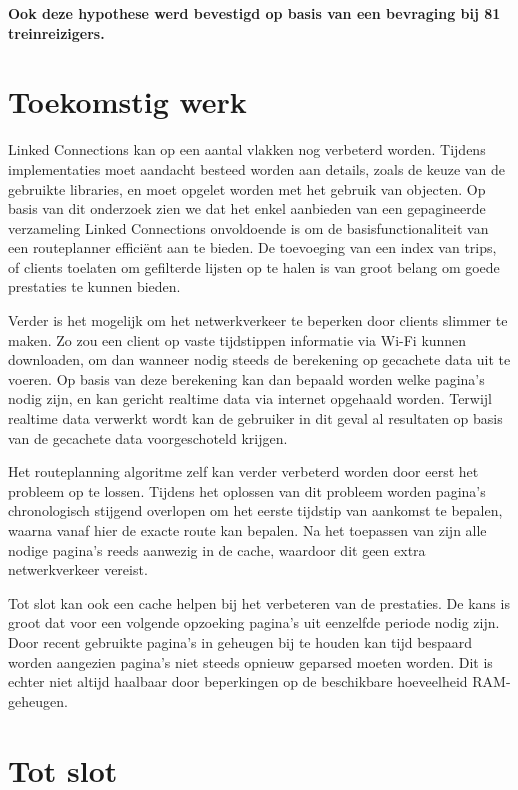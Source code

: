 \textbf{Ook deze hypothese werd bevestigd op basis van een bevraging bij 81 treinreizigers.}
	
\section{Toekomstig werk}
\label{sec:futurework}
Linked Connections kan op een aantal vlakken nog verbeterd worden. Tijdens implementaties moet aandacht besteed worden aan details, zoals de keuze van de gebruikte libraries, en moet opgelet worden met het gebruik van  objecten. Op basis van dit onderzoek zien we dat het enkel aanbieden van een gepagineerde verzameling Linked Connections onvoldoende is om de basisfunctionaliteit van een routeplanner efficiënt aan te bieden. De toevoeging van een index van trips, of clients toelaten om gefilterde lijsten op te halen is van groot belang om goede prestaties te kunnen bieden.

Verder is het mogelijk om het netwerkverkeer te beperken door clients slimmer te maken. Zo zou een client op vaste tijdstippen informatie via Wi-Fi kunnen downloaden, om dan wanneer nodig steeds de berekening op gecachete data uit te voeren. Op basis van deze berekening kan dan bepaald worden welke pagina's nodig zijn, en kan gericht realtime data via internet opgehaald worden. Terwijl realtime data verwerkt wordt kan de gebruiker in dit geval al resultaten op basis van de gecachete data voorgeschoteld krijgen.

Het routeplanning algoritme zelf kan verder verbeterd worden door eerst het  probleem op te lossen. Tijdens het oplossen van dit probleem worden pagina's chronologisch stijgend overlopen om het eerste tijdstip van aankomst te bepalen, waarna  vanaf hier de exacte route kan bepalen. Na het toepassen van  zijn alle nodige pagina's reeds aanwezig in de cache, waardoor dit geen extra netwerkverkeer vereist.

Tot slot kan ook een  cache helpen bij het verbeteren van de prestaties. De kans is groot dat voor een volgende opzoeking pagina's uit eenzelfde periode nodig zijn. Door recent gebruikte pagina's in geheugen bij te houden kan tijd bespaard worden aangezien pagina's niet steeds opnieuw geparsed moeten worden. Dit is echter niet altijd haalbaar door beperkingen op de beschikbare hoeveelheid RAM-geheugen.

\section{Tot slot}
	
